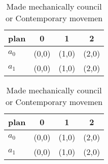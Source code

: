 \documentclass[a4paper]{article}
\begin{document}
\begin{table}
\begin{adjustbox}{width=0.6\columnwidth}
\begin{tabular}{|l|l|l|l|}
\hline
\textbf{plan} & \multicolumn{1}{c|}{\textbf{0}} & \multicolumn{1}{c|}{\textbf{1}} & \multicolumn{1}{c|}{\textbf{2}} \\ \hline
\textbf{$a_0$}  & (0,0) & (1,0) & (2,0) \\ \hline
\textbf{$a_1$}  & (0,0) & (1,0) & (2,0) \\ \hline
\end{tabular}
\end{adjustbox}
\caption{Made mechanically council or Contemporary movemen
}
\end{table}

\begin{table}
\begin{adjustbox}{width=0.6\columnwidth}
\begin{tabular}{|l|l|l|l|}
\hline
\textbf{plan} & \multicolumn{1}{c|}{\textbf{0}} & \multicolumn{1}{c|}{\textbf{1}} & \multicolumn{1}{c|}{\textbf{2}} \\ \hline
\textbf{$a_0$}  & (0,0) & (1,0) & (2,0) \\ \hline
\textbf{$a_1$}  & (0,0) & (1,0) & (2,0) \\ \hline
\end{tabular}
\end{adjustbox}
\caption{Made mechanically council or Contemporary movemen
}
\end{table}
\end{document}
